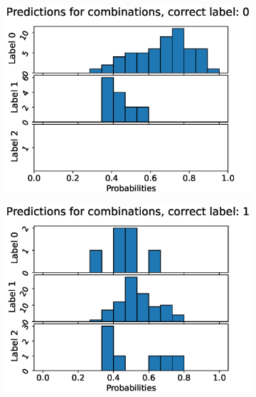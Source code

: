 \begin{figure}
  \centering
  \begin{subfigure}[t]{0.33\textwidth}
    \includegraphics[width=\textwidth]{files/figs/res/femval/pc0.eps}
    \caption{}
    \label{fig:femval-pc0}
  \end{subfigure}%
  \begin{subfigure}[t]{0.33\textwidth}
    \includegraphics[width=\textwidth]{files/figs/res/femval/pc1.eps}
    \caption{}
    \label{fig:femval-pc1}
  \end{subfigure}%
  \begin{subfigure}[t]{0.33\textwidth}

\end{subfigure}
\end{figure}
